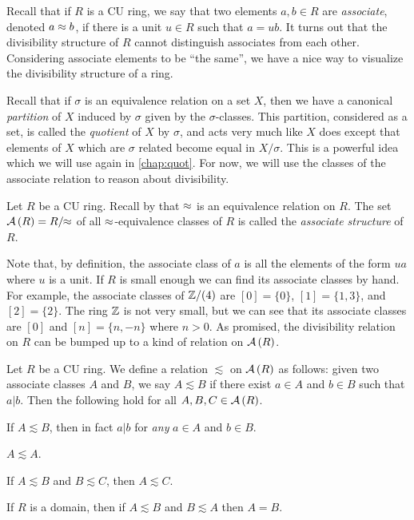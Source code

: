 Recall that if \(R\) is a CU ring, we say that two elements \(a,b \in R\) are \emph{associate}, denoted \(a \approx b\), if there is a unit \(u \in R\) such that \(a = ub\).
It turns out that the divisibility structure of \(R\) cannot distinguish associates from each other.
Considering associate elements to be ``the same'', we have a nice way to visualize the divisibility structure of a ring.

Recall that if \(\sigma\) is an equivalence relation on a set \(X\), then we have a canonical \emph{partition} of \(X\) induced by \(\sigma\) given by the \(\sigma\)-classes.
This partition, considered as a set, is called the \emph{quotient} of \(X\) by \(\sigma\), and acts very much like \(X\) does except that elements of \(X\) which are \(\sigma\) related become equal in \(X/\sigma\).
This is a powerful idea which we will use again in \autoref{chap:quot}.
For now, we will use the classes of the associate relation to reason about divisibility.

\begin{dfn} \label{dfn:assoc-sld}
Let \(R\) be a CU ring.
Recall by  that \(\approx\) is an equivalence relation on \(R\).
The set \( \mathcal{A}\left(R\right)  = R/\!\!\approx\) of all \(\approx\)-equivalence classes of \(R\) is called the \emph{associate structure} of \(R\).
\end{dfn}

Note that, by definition, the associate class of \(a\) is all the elements of the form \(ua\) where \(u\) is a unit.
If \(R\) is small enough we can find its associate classes by hand.
For example, the associate classes of \(\mathbb{Z}/(4)\) are \([0] = \{0\}\), \([1] = \{1,3\}\), and \([2] = \{2\}\).
The ring \(\mathbb{Z}\) is not very small, but we can see that its associate classes are \([0]\) and \([n] = \{ n, -n \}\) where \(n > 0\).
As promised, the divisibility relation on \(R\) can be bumped up to a kind of relation on \( \mathcal{A}\left(R\right) \).

\begin{prop}
Let \(R\) be a CU ring.
We define a relation \(\lesssim\) on \( \mathcal{A}\left(R\right) \) as follows: given two associate classes \(A\) and \(B\), we say \(A \lesssim B\) if there exist \(a \in A\) and \(b \in B\) such that \(a|b\).
Then the following hold for all \(A,B,C \in  \mathcal{A}\left(R\right) \).
\begin{proplist*}
\item If \(A \lesssim B\), then in fact \(a|b\) for \emph{any} \(a \in A\) and \(b \in B\).
\item \(A \lesssim A\).
\item If \(A \lesssim B\) and \(B \lesssim C\), then \(A \lesssim C\).
\item If \(R\) is a domain, then if \(A \lesssim B\) and \(B \lesssim A\) then \(A = B\).
\end{proplist*}
\end{prop}

